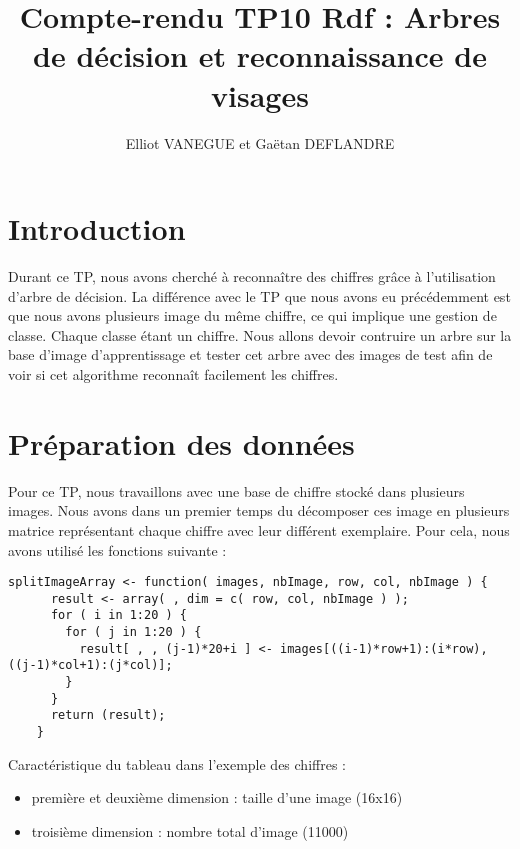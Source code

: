 \documentclass[a4paper,11pt]{article}
\title{Compte-rendu TP10 Rdf : Arbres de décision et reconnaissance de visages}
\author{Elliot VANEGUE et Gaëtan DEFLANDRE}
\begin{document}
  
  
  
  \maketitle
  
  \mbox{}
  \newpage
  \clearpage
  
  \section*{Introduction}
  Durant ce TP, nous avons cherché à reconnaître des chiffres grâce à l'utilisation d'arbre
  de décision. La différence avec le TP que nous avons eu précédemment est que nous avons 
  plusieurs image du même chiffre, ce qui implique une gestion de classe. Chaque classe étant
  un chiffre. Nous allons devoir contruire un arbre sur la base d'image d'apprentissage et tester
  cet arbre avec des images de test afin de voir si cet algorithme reconnaît facilement les chiffres.
  
  \section{Préparation des données}
  Pour ce TP, nous travaillons avec une base de chiffre stocké dans plusieurs images. Nous avons dans un premier temps
  du décomposer ces image en plusieurs matrice représentant chaque chiffre avec leur différent exemplaire. Pour cela, nous avons utilisé les 
  fonctions suivante : 
  
  \begin{lstlisting}[caption=Fonction de décomposition de la base]
    splitImageArray <- function( images, nbImage, row, col, nbImage ) {
      result <- array( , dim = c( row, col, nbImage ) );
      for ( i in 1:20 ) {
        for ( j in 1:20 ) {
          result[ , , (j-1)*20+i ] <- images[((i-1)*row+1):(i*row), ((j-1)*col+1):(j*col)];
        }
      }
      return (result);
    }
  \end{lstlisting}
  
  Caractéristique du tableau dans l'exemple des chiffres :
  \begin{itemize}
   \item première et deuxième dimension : taille d'une image (16x16)
   \item troisième dimension : nombre total d'image (11000)
  \end{itemize}
\end{document}
